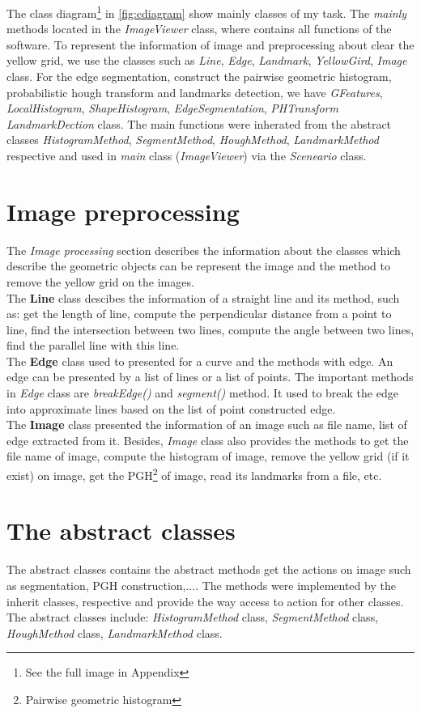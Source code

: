 The class diagram\footnote{See the full image in Appendix} in \ref{fig:cdiagram} show mainly classes of my task. The \textit{mainly} methods located in the \textit{ImageViewer} class, where contains all functions of the software. To represent the information of image and preprocessing about clear the yellow grid, we use the classes such as \textit{Line}, \textit{Edge}, \textit{Landmark}, \textit{YellowGird}, \textit{Image} class. For the edge segmentation, construct the pairwise geometric histogram, probabilistic hough transform and landmarks detection, we have \textit{GFeatures}, \textit{LocalHistogram}, \textit{ShapeHistogram}, \textit{EdgeSegmentation}, \textit{PHTransform} \textit{LandmarkDection} class. The main functions were inherated from the abstract classes \textit{HistogramMethod}, \textit{SegmentMethod}, \textit{HoughMethod}, \textit{LandmarkMethod} respective and used in \textit{main} class (\textit{ImageViewer}) via the \textit{Sceneario} class. 
\section{Image preprocessing}
The \textit{Image processing} section describes the information about the classes which describe the geometric objects can be represent the image and the method to remove the yellow grid on the images.\\[0.2cm]
The \textbf{Line} class descibes the information of a straight line and its method, such as: get the length of line, compute the perpendicular distance from a point to line, find the intersection between two lines, compute the angle between two lines, find the parallel line with this line.\\[0.2cm]
The \textbf{Edge} class used to presented for a curve and the methods with edge. An edge can be presented by a list of lines or a list of points. The important methods in \textit{Edge} class are \textit{breakEdge()} and \textit{segment()} method. It used to break the edge into approximate lines based on the list of point constructed edge.\\[0.2cm]
The \textbf{Image} class presented the information of an image such as file name, list of edge extracted from it. Besides, \textit{Image} class also provides the methods to get the file name of image, compute the histogram of image, remove the yellow grid (if it exist) on image, get the PGH\footnote{Pairwise geometric histogram} of image, read its landmarks from a file, etc. \\[0.2cm]
\section{The abstract classes}
The abstract classes contains the abstract methods get the actions on image such as segmentation, PGH construction,.... The methods were implemented by the inherit classes, respective and provide the way access to action for other classes. The abstract classes include: \textit{HistogramMethod} class, \textit{SegmentMethod} class, \textit{HoughMethod} class, \textit{LandmarkMethod} class.
